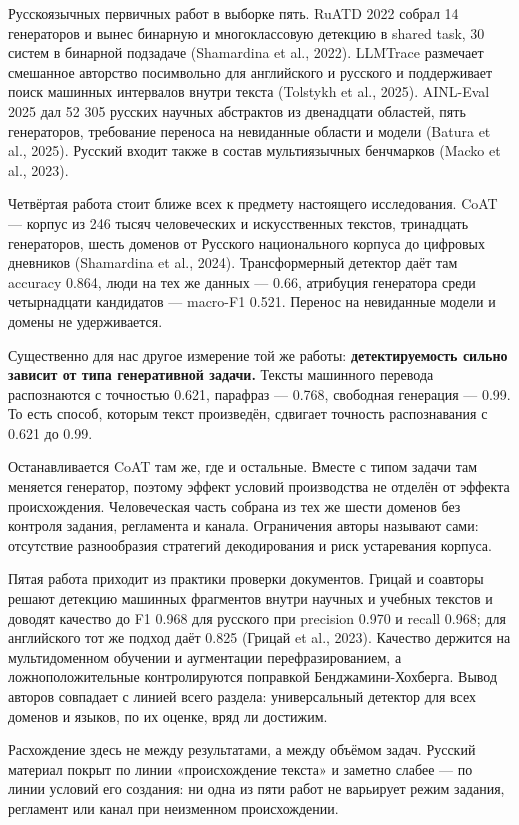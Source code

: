 \documentclass[11pt,a4paper]{article}
\renewcommand{\_}{\textunderscore\allowbreak}
\begin{document}
Русскоязычных первичных работ в выборке пять. RuATD 2022 собрал 14 генераторов
и вынес бинарную и многоклассовую детекцию в shared task, 30 систем в бинарной
подзадаче (Shamardina et al., 2022). LLMTrace размечает смешанное авторство посимвольно для
английского и русского и поддерживает поиск машинных интервалов внутри текста
(Tolstykh et al., 2025). AINL-Eval 2025 дал 52 305 русских научных абстрактов из двенадцати
областей, пять генераторов, требование переноса на невиданные области и модели
(Batura et al., 2025). Русский входит также в состав мультиязычных бенчмарков (Macko et al., 2023).

Четвёртая работа стоит ближе всех к предмету настоящего исследования. CoAT —
корпус из 246 тысяч человеческих и искусственных текстов, тринадцать генераторов,
шесть доменов от Русского национального корпуса до цифровых дневников (Shamardina et al., 2024).
Трансформерный детектор даёт там accuracy 0.864, люди на тех же данных — 0.66,
атрибуция генератора среди четырнадцати кандидатов — macro-F1 0.521. Перенос на
невиданные модели и домены не удерживается.

Существенно для нас другое измерение той же работы: \textbf{детектируемость сильно
зависит от типа генеративной задачи.} Тексты машинного перевода распознаются с
точностью 0.621, парафраз — 0.768, свободная генерация — 0.99. То есть способ,
которым текст произведён, сдвигает точность распознавания с 0.621 до 0.99.

Останавливается CoAT там же, где и остальные. Вместе с типом задачи там меняется
генератор, поэтому эффект условий производства не отделён от эффекта
происхождения. Человеческая часть собрана из тех же шести доменов без контроля
задания, регламента и канала. Ограничения авторы называют сами: отсутствие
разнообразия стратегий декодирования и риск устаревания корпуса.

Пятая работа приходит из практики проверки документов. Грицай и соавторы решают
детекцию машинных фрагментов внутри научных и учебных текстов и доводят качество
до F1 0.968 для русского при precision 0.970 и recall 0.968; для английского тот
же подход даёт 0.825 (Грицай et al., 2023). Качество держится на мультидоменном обучении и
аугментации перефразированием, а ложноположительные контролируются поправкой
Бенджамини-Хохберга. Вывод авторов совпадает с линией всего раздела: универсальный
детектор для всех доменов и языков, по их оценке, вряд ли достижим.

Расхождение здесь не между результатами, а между объёмом задач. Русский материал
покрыт по линии «происхождение текста» и заметно слабее — по линии условий его
создания: ни одна из пяти работ не варьирует режим задания, регламент или
канал при неизменном происхождении.
\end{document}
